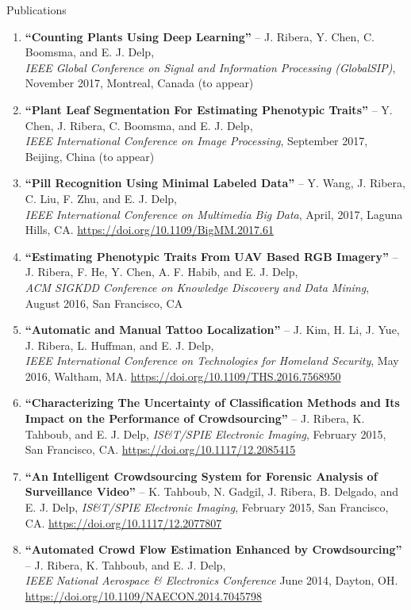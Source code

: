 \documentclass{resume} %
\begin{document}
\begin{rSection}{Publications}

\footnotesize
\begin{enumerate}
\setlength{\itemindent}{-.1in}
\item 
\textbf{``Counting Plants Using Deep Learning''} -- J. Ribera, Y. Chen, C. Boomsma, and E. J. Delp, \\
		\emph{IEEE Global Conference on Signal and Information Processing (GlobalSIP)}, November 2017, Montreal, Canada (to appear)
\item 
\textbf{``Plant Leaf Segmentation For Estimating Phenotypic Traits''} -- Y. Chen, J. Ribera, C. Boomsma, and E. J. Delp, \\
		\emph{IEEE International Conference on Image Processing}, September 2017, Beijing, China (to appear)
\item 
\textbf{``Pill Recognition Using Minimal Labeled Data''} -- Y. Wang, J. Ribera, C. Liu, F. Zhu, and E. J. Delp, \\
		\emph{IEEE International Conference on Multimedia Big Data}, April, 2017, Laguna Hills, CA. \url{https://doi.org/10.1109/BigMM.2017.61}
\item 
\textbf{``Estimating Phenotypic Traits From UAV Based RGB Imagery''} -- J. Ribera, F. He, Y. Chen, A. F. Habib, and E. J. Delp, \\
		\emph{ACM SIGKDD Conference on Knowledge Discovery and Data Mining}, August 2016, San Francisco, CA
\item 
\textbf{``Automatic and Manual Tattoo Localization''} -- J. Kim, H. Li, J. Yue, J. Ribera, L. Huffman, and E. J. Delp, \\
		\emph{IEEE International Conference on Technologies for Homeland Security}, May 2016, Waltham, MA. \url{https://doi.org/10.1109/THS.2016.7568950}
\item 
\textbf{``Characterizing The Uncertainty of Classification Methods and Its Impact on the Performance of Crowdsourcing''} -- J. Ribera, K. Tahboub, and E. J. Delp, \emph{IS\&T/SPIE Electronic Imaging}, February 2015, San Francisco, CA. \url{https://doi.org/10.1117/12.2085415}
\item 
\textbf{``An Intelligent Crowdsourcing System for Forensic Analysis of Surveillance Video''} -- K. Tahboub, N. Gadgil, J. Ribera, B. Delgado, and E. J. Delp, \emph{IS\&T/SPIE Electronic Imaging}, February 2015, San Francisco, CA. \url{https://doi.org/10.1117/12.2077807}
\item 
\textbf{``Automated Crowd Flow Estimation Enhanced by Crowdsourcing''} -- J. Ribera, K. Tahboub, and E. J. Delp, \\
		\emph{IEEE National Aerospace \& Electronics Conference} June 2014, Dayton, OH. \url{https://doi.org/10.1109/NAECON.2014.7045798}
\end{enumerate}

\vspace{5pt}

\end{rSection}
\end{document}
